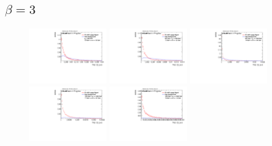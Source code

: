 \subsection*{$\beta=3$}
\begin{figure}
\includegraphics[width=0.3\textwidth]{sascha_input/Appendix/Distributions/w/distributions/beta3/h_assisted_tj_C2_3_bin1.pdf} \hspace{1mm}
\includegraphics[width=0.3\textwidth]{sascha_input/Appendix/Distributions/w/distributions/beta3/h_assisted_tj_C2_3_bin2.pdf} \hspace{1mm}
\includegraphics[width=0.3\textwidth]{sascha_input/Appendix/Distributions/w/distributions/beta3/h_assisted_tj_C2_3_bin3.pdf} 
\bigskip
\includegraphics[width=0.3\textwidth]{sascha_input/Appendix/Distributions/w/distributions/beta3/h_assisted_tj_C2_3_bin4.pdf} \hspace{1mm}
\includegraphics[width=0.3\textwidth]{sascha_input/Appendix/Distributions/w/distributions/beta3/h_assisted_tj_C2_3_bin5.pdf} \hspace{1mm}

\end{figure}
